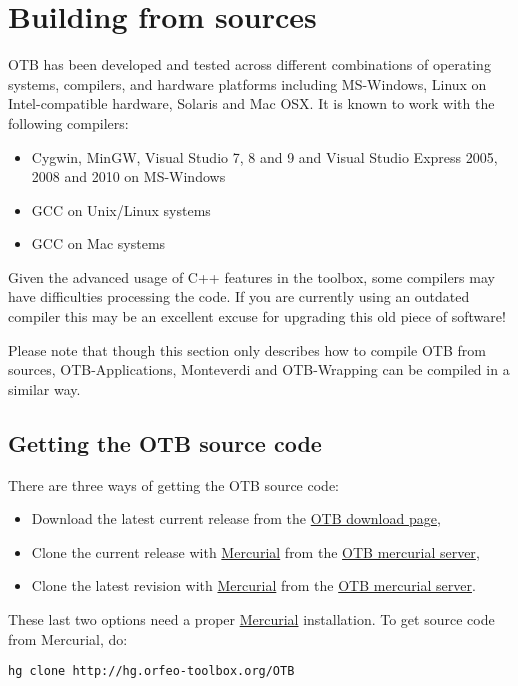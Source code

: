 \section{Building from sources}
\label{sec:source}
OTB has been developed and tested across different combinations of
operating systems, compilers, and hardware platforms including
MS-Windows, Linux on Intel-compatible hardware, Solaris and Mac
OSX.  It is known to work with the following compilers:
\begin{itemize}
\item Cygwin, MinGW, Visual Studio 7, 8 and 9 and Visual Studio Express 2005, 
  2008 and 2010 on MS-Windows%
\item GCC on Unix/Linux systems
\item GCC on Mac systems
\end{itemize}

Given the advanced usage of C++ features in the toolbox, some
compilers may have difficulties processing the code. If you are
currently using an outdated compiler this may be an excellent excuse
for upgrading this old piece of software!

Please note that though this section only describes how to compile OTB from sources,
OTB-Applications, Monteverdi and OTB-Wrapping can be compiled in a similar way.

\subsection{Getting the OTB source code}

There are three ways of getting the OTB source code:
\begin{itemize}
\item Download the latest current release from the \href{http://sourceforge.net/projects/orfeo-toolbox/}{OTB download page},
\item Clone the current release with \href{http://mercurial.selenic.com}{Mercurial} from the \href{http://hg.orfeo-toolbox.org/OTB}{OTB mercurial server},
\item Clone the latest revision with \href{http://mercurial.selenic.com}{Mercurial} from the \href{http://hg.orfeo-toolbox.org/OTB}{OTB mercurial server}.
\end{itemize}

These last two options need a proper \href{http://mercurial.selenic.com}{Mercurial} installation. To get source code from Mercurial, do:
\begin{verbatim}
hg clone http://hg.orfeo-toolbox.org/OTB
\end{verbatim}

